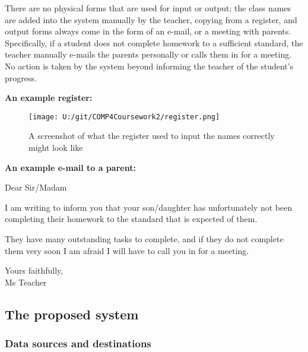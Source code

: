 There are no physical forms that are used for input or output; the class names are added into the system manually by the teacher, copying from a register, and output forms always come in the form of an e-mail, or a meeting with parents. Specifically, if a student does not complete homework to a sufficient standard, the teacher manually e-mails the parents personally or calls them in for a meeting. No action is taken by the system beyond informing the teacher of the student's progress.

\textbf{An example register:}

\begin{figure}[H]
    \texttt{[image: U:/git/COMP4Coursework2/register.png]}
    \caption{A screenshot of what the register used to input the names correctly might look like} \label{fig:print_function_result}
\end{figure}

\textbf{An example e-mail to a parent:}

Dear Sir/Madam

I am writing to inform you that your son/daughter has unfortunately not been completing their homework to the standard that is expected of them. 

They have many outstanding tasks to complete, and if they do not complete them very soon I am afraid I will have to call you in for a meeting.

Yours faithfully, \\
Ms Teacher

\subsection{The proposed system}

\subsubsection{Data sources and destinations}

